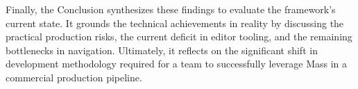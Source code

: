 Finally, the Conclusion synthesizes these findings to evaluate the framework's current state. It grounds the technical achievements in reality by discussing the practical production risks, the current deficit in editor tooling, and the remaining bottlenecks in navigation. Ultimately, it reflects on the significant shift in development methodology required for a team to successfully leverage Mass in a commercial production pipeline.